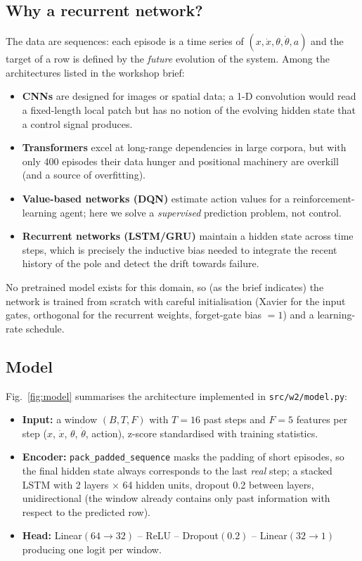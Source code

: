 \documentclass[conference]{IEEEtran}
\begin{document}
\subsection{Why a recurrent network?}
The data are sequences: each episode is a time series of
$(x, \dot x, \theta, \dot\theta, a)$ and the target of a row is defined by the
\emph{future} evolution of the system. Among the architectures listed in the
workshop brief:
\begin{itemize}
\item \textbf{CNNs} are designed for images or spatial data; a 1-D convolution
      would read a fixed-length local patch but has no notion of the evolving
      hidden state that a control signal produces.
\item \textbf{Transformers} excel at long-range dependencies in large corpora,
      but with only 400 episodes their data hunger and positional machinery
      are overkill (and a source of overfitting).
\item \textbf{Value-based networks (DQN)} estimate action values for a
      reinforcement-learning agent; here we solve a \emph{supervised}
      prediction problem, not control.
\item \textbf{Recurrent networks (LSTM/GRU)} maintain a hidden state across
      time steps, which is precisely the inductive bias needed to integrate
      the recent history of the pole and detect the drift towards failure.
\end{itemize}
No pretrained model exists for this domain, so (as the brief indicates) the
network is trained from scratch with careful initialisation (Xavier for the
input gates, orthogonal for the recurrent weights, forget-gate bias $=1$) and
a learning-rate schedule.

\subsection{Model}
Fig.~\ref{fig:model} summarises the architecture implemented in
\texttt{src/w2/model.py}:

\begin{itemize}
\item \textbf{Input:} a window $(B, T, F)$ with $T=16$ past steps and
      $F=5$ features per step ($x$, $\dot x$, $\theta$, $\dot\theta$,
      action), z-score standardised with training statistics.
\item \textbf{Encoder:} \texttt{pack\_padded\_sequence} masks the padding of
      short episodes, so the final hidden state always corresponds to the
      last \emph{real} step; a stacked LSTM with 2 layers $\times$ 64 hidden
      units, dropout 0.2 between layers, unidirectional (the window already
      contains only past information with respect to the predicted row).
\item \textbf{Head:} Linear$(64 \rightarrow 32)$ -- ReLU -- Dropout$(0.2)$ --
      Linear$(32 \rightarrow 1)$ producing one logit per window.
\end{itemize}
\end{document}
